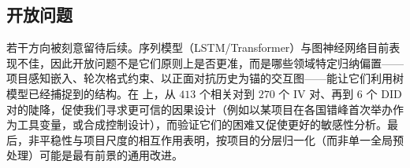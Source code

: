 \subsection{开放问题}
\label{sec:disc-open}

若干方向被刻意留待后续。序列模型（LSTM/Transformer）与图神经网络目前表现不佳，因此开放问题不是它们原则上是否更准，而是哪些领域特定归纳偏置——项目感知嵌入、轮次格式约束、以正面对抗历史为锚的交互图——能让它们利用树模型已经捕捉到的结构。在  上，从 $413$ 个相关对到 $270$ 个 IV 对、再到 $6$ 个 DID 对的陡降，促使我们寻求更可信的因果设计（例如以某项目在各国错峰首次举办作为工具变量，或合成控制设计），而验证它们的困难又促使更好的敏感性分析。最后，非平稳性与项目尺度的相互作用表明，按项目的分层归一化（而非单一全局预处理）可能是最有前景的通用改进。
